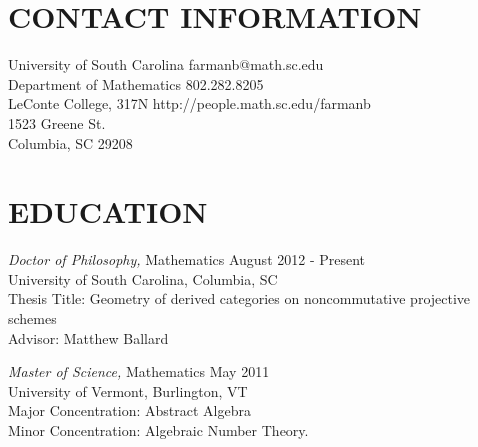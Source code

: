 \documentclass[line,overlapped]{res}
\begin{document}

\begin{resume}
  

  \section{CONTACT INFORMATION}
  University of South Carolina \hfill farmanb@math.sc.edu\\
  Department of Mathematics \hfill 802.282.8205\\
  LeConte College, 317N \hfill http://people.math.sc.edu/farmanb\\
  1523 Greene St.\\
  Columbia, SC 29208
  

  \section{EDUCATION} 
          {\sl Doctor of Philosophy,} Mathematics \hfill August 2012 - Present\\
          University of South Carolina, Columbia, SC\\
          Thesis Title: Geometry of derived categories on noncommutative projective schemes\\
          Advisor: Matthew Ballard

          {\sl Master of Science,} Mathematics \hfill May 2011\\
          University of Vermont, Burlington, VT\\
          Major Concentration: Abstract Algebra\\
          Minor Concentration: Algebraic Number Theory.


\end{resume}
\end{document}
